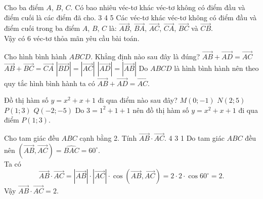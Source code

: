 \begin{ex}%
	Cho ba điểm $A$, $B$, $C$. Có bao nhiêu véc-tơ khác véc-tơ không có điểm đầu và điểm cuối là các điểm đã cho.
	\choice
	{3}
	{4}
	{5}
	{}
	\loigiai
	{Các véc-tơ khác véc-tơ không có điểm đầu và điểm cuối trong ba điểm $A$, $B$, $C$ là: $\overrightarrow{AB}$, $\overrightarrow{BA}$, $\overrightarrow{AC}$, $\overrightarrow{CA}$, $\overrightarrow{BC}$ và $\overrightarrow{CB}$.\\
		Vậy có 6 véc-tơ thỏa mãn yêu cầu bài toán.		
	}
\end{ex}

\begin{ex}%
	Cho hình bình hành $ ABCD $. Khẳng định nào sau đây là đúng?
	\choice
	{\True $\overrightarrow{AB}+\overrightarrow{AD}=\overrightarrow{AC}$}
	{$\overrightarrow{AB}+\overrightarrow{BC}=\overrightarrow{CA}$}
	{$\left|\overrightarrow{BD}\right|=\left|\overrightarrow{AC}\right|$}
	{$\left|\overrightarrow{AD}\right|=\left|\overrightarrow{AB}\right|$}
	\loigiai
	{Do $ ABCD $ là hình bình hành nên theo quy tắc hình bình hành ta có $\overrightarrow{AB}+\overrightarrow{AD}=\overrightarrow{AC}$.
	}
\end{ex}

\begin{ex}%
	Đồ thị hàm số $y=x^2+x+1$ đi qua điểm nào sau đây?
	\choice
	{$M(0;-1)$}
	{$N(2;5)$}
	{\True $P(1;3)$}
	{$Q(-2;-5)$}
	\loigiai
	{Do $3=1^2+1+1$ nên đồ thị hàm số $y=x^2+x+1$ đi qua điểm $P(1;3)$.
	}
\end{ex}

\begin{ex}%
	Cho tam giác đều $ABC$ cạnh bằng 2. Tính $\overrightarrow{AB}\cdot\overrightarrow{AC}$.
	\choice
	{4}
	{3}
	{}
	{1}
	\loigiai
	{Do tam giác $ ABC $ đều nên $\left(\overrightarrow{AB},\overrightarrow{AC}\right)=\widehat{BAC}=60^{\circ}$.\\
		Ta có \[\overrightarrow{AB}\cdot\overrightarrow{AC}=\left|\overrightarrow{AB}\right|\cdot\left|\overrightarrow{AC}\right|\cdot\cos\left(\overrightarrow{AB},\overrightarrow{AC}\right)=2\cdot2\cdot\cos60^{\circ}=2.\]
		Vậy $\overrightarrow{AB}\cdot\overrightarrow{AC}=2$.	
	}
\end{ex}

